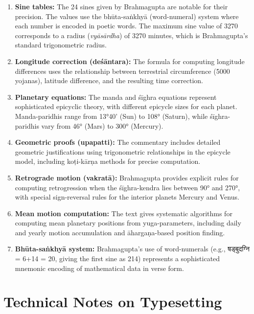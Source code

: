 \documentclass[11pt,a4paper]{book}
\begin{document}
\begin{enumerate}
\item \textbf{Sine tables:} The 24 sines given by Brahmagupta are notable for their precision. The values use the bhūta-saṅkhyā (word-numeral) system where each number is encoded in poetic words. The maximum sine value of 3270 corresponds to a radius (\textit{vyāsārdha}) of 3270 minutes, which is Brahmagupta's standard trigonometric radius.

\item \textbf{Longitude correction (deśāntara):} The formula for computing longitude differences uses the relationship between terrestrial circumference (5000 yojanas), latitude difference, and the resulting time correction.

\item \textbf{Planetary equations:} The manda and śīghra equations represent sophisticated epicyclic theory, with different epicycle sizes for each planet. Manda-paridhis range from 13°40' (Sun) to 108° (Saturn), while śīghra-paridhis vary from 46° (Mars) to 300° (Mercury).

\item \textbf{Geometric proofs (upapatti):} The commentary includes detailed geometric justifications using trigonometric relationships in the epicycle model, including koṭi-kārṇa methods for precise computation.

\item \textbf{Retrograde motion (vakratā):} Brahmagupta provides explicit rules for computing retrogression when the śīghra-kendra lies between 90° and 270°, with special sign-reversal rules for the interior planets Mercury and Venus.

\item \textbf{Mean motion computation:} The text gives systematic algorithms for computing mean planetary positions from yuga-parameters, including daily and yearly motion accumulation and āhargaṇa-based position finding.

\item \textbf{Bhūta-saṅkhyā system:} Brahmagupta's use of word-numerals (e.g., षड्बुदग्नि = 6+14 = 20, giving the first sine as 214) represents a sophisticated mnemonic encoding of mathematical data in verse form.
\end{enumerate}

\section{Technical Notes on Typesetting}
\end{document}
